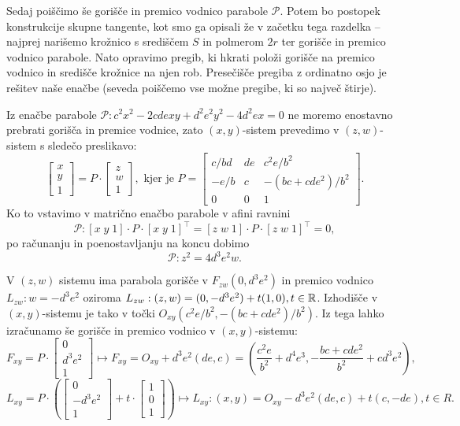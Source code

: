 Sedaj poiščimo še gorišče in premico vodnico parabole $\mathcal{P}$. Potem bo postopek konstrukcije skupne tangente, kot smo ga opisali že v začetku tega razdelka -- najprej narišemo krožnico s središčem $S$ in polmerom $2r$ ter gorišče in premico vodnico parabole. Nato opravimo pregib, ki hkrati položi gorišče na premico vodnico in središče krožnice na njen rob. Presečišče pregiba z ordinatno osjo je rešitev naše enačbe (seveda poiščemo vse možne pregibe, ki so največ štirje).

Iz enačbe parabole $\mathcal{P}: c^2x^2 - 2cdexy + d^2e^2y^2 - 4d^2ex = 0$ ne moremo enostavno prebrati gorišča in premice vodnice, zato $(x, y)$-sistem prevedimo v $(z, w)$-sistem s sledečo preslikavo:
$$ \begin{bmatrix} x\\y\\1\end{bmatrix} = P \cdot \begin{bmatrix} z\\w\\1\end{bmatrix}, \text{ kjer je } P =
\begin{bmatrix}
    c/bd & de & c^2e/b^2\\
    -e/b & c & -(bc + cde^2)/b^2\\
    0 & 0 & 1
\end{bmatrix}.
$$
Ko to vstavimo v matrično enačbo parabole v afini ravnini
$$\mathcal{P} : [x\;y\;1] \cdot P \cdot [x\;y\;1]^\intercal = [z\;w\;1] \cdot P \cdot [z\;w\;1]^\intercal = 0,$$
po računanju in poenostavljanju na koncu dobimo
$$ \mathcal{P}: z^2 = 4d^3e^2w. $$

V $(z, w)$ sistemu ima parabola gorišče v $F_{zw}(0, d^3e^2)$ in premico vodnico $L_{zw}: w = - d^3e^2$ oziroma $L_{zw}: (z, w) = (0, -d^3e^2) + t(1, 0), t \in \mathbb R $. Izhodišče v $(x, y)$-sistemu je tako v točki $O_{xy} (c^2e/b^2, -(bc + cde^2)/b^2)$. Iz tega lahko izračunamo še gorišče in premico vodnico v $(x, y)$-sistemu:
$$ F_{xy} = P \cdot \begin{bmatrix} 0\\d^3e^2\\1\end{bmatrix} \longmapsto F_{xy} = O_{xy} + d^3e^2(de, c) = \left(\frac{c^2e}{b^2} + d^4e^3, -\frac{bc + cde^2}{b^2} + cd^3e^2\right),$$
$$ L_{xy} = P \cdot \left( \begin{bmatrix} 0\\-d^3e^2\\1\end{bmatrix} + t \cdot \begin{bmatrix} 1\\0\\1\end{bmatrix} \right) \longmapsto L_{xy}: (x, y) = O_{xy} - d^3e^2(de, c) + t(c, -de), t \in R.$$


